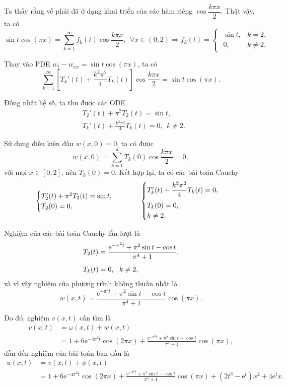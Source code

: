 \documentclass[10pt, a4paper]{article}
\begin{document}
	Ta thấy rằng vế phải đã ở dạng khai triển của các hàm riêng $\cos\dfrac{k\pi x}{2}$. Thật vậy, ta có $$\sin t\cos(\pi x)=\sum_{k=1}^\infty f_k(t)\cos\frac{k\pi x}{2},~~\forall x\in(0,2)\Rightarrow f_k(t)=\begin{cases}
		\begin{array}{ll}
			\sin t, & k=2, \\
			0, & k\ne2.
		\end{array}
	\end{cases}$$
	
	Thay vào PDE $w_{t}-w_{xx}=\sin t\cos(\pi x)$, ta có $$\sum_{k=1}^\infty\left[T_k'(t)+\frac{k^2\pi^2}{4}T_k(t)\right]\cos\frac{k\pi x}{2}=\sin t\cos(\pi x).$$
	
	Đồng nhất hệ số, ta thu được các ODE \begin{align*}
		&T_2'(t)+\pi^2T_2(t)=\sin t,\\
		&T_k'(t)+\frac{k^2\pi^2}{4}T_k(t)=0,~~k\ne2.
	\end{align*}
	
	Sử dụng điều kiện đầu $w(x,0)=0$, ta có được $$w(x,0)=\displaystyle\sum_{k=1}^\infty T_k(0)\cos\frac{k\pi x}{2}=0,$$
	với mọi $x\in[0,2]$, nên $T_k(0)=0$. Kết hợp lại, ta có các bài toán Cauchy $$\begin{cases}
		T_2'(t)+\pi^2T_2(t)=\sin t,\\
		T_2(0)=0,
	\end{cases}\hspace{1cm}\begin{cases}
		T_k'(t)+\dfrac{k^2\pi^2}{4}T_k(t)=0,\\
		\noalign{\vskip5pt}
		T_k(0)=0,\\
		k\ne2.
	\end{cases}$$
	
	Nghiệm của các bài toán Cauchy lần lượt là \begin{align*}
		&T_2(t)=\frac{\mathrm e^{-\pi^2t}+\pi^2\sin t-\cos t}{\pi^4+1},\\
		\noalign{\vskip5pt}
		&T_k(t)=0,~~k\ne2,
	\end{align*}
	và vì vậy nghiệm của phương trình không thuần nhất là $$w(x,t)=\frac{\mathrm e^{-\pi^2t}+\pi^2\sin t-\cos t}{\pi^4+1}\cos(\pi x).$$
	
	Do đó, nghiệm $v(x,t)$ cần tìm là \begin{align*}
		v(x,t)&=\omega(x,t)+w(x,t)\\
		&=1+6\mathrm e^{-4\pi^2t}\cos(2\pi x)+\frac{\mathrm e^{-\pi^2t}+\pi^2\sin t-\cos t}{\pi^4+1}\cos(\pi x),
	\end{align*}
	dẫn đến nghiệm của bài toán ban đầu là \begin{align*}
		u(x,t)&=v(x,t)+\phi(x,t)\\
		&=1+6\mathrm e^{-4\pi^2t}\cos(2\pi x)+\frac{\mathrm e^{-\pi^2t}+\pi^2\sin t-\cos t}{\pi^4+1}\cos(\pi x)+(2t^3-\mathrm e^t)x^2+4\mathrm e^tx.
	\end{align*}
\end{document}
